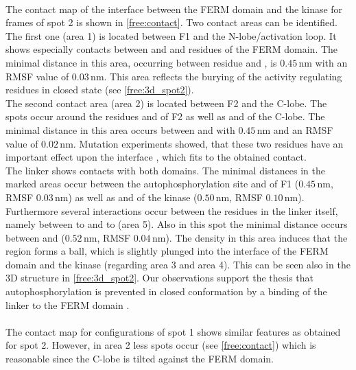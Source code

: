 %
%
%
\\
The contact map of the interface between the FERM domain and the kinase for frames of spot 2 is shown in \autoref{free:contact}. Two contact areas can be identified. The first one (area 1) is located between F1 and the N-lobe/activation loop. It shows especially contacts between  and  and residues of the FERM domain. The minimal distance in this area, occurring between residue  and , is $0.45\,\si{\nano\metre}$ with an RMSF value of $0.03\,\si{\nano\metre}$. This area reflects the burying of the activity regulating residues in closed state (see \autoref{free:3d_spot2}).\\
The second contact area (area 2) is located between F2 and the C-lobe. The spots occur around the residues  and  of F2 as well as  and  of the C-lobe. The minimal distance in this area occurs between  and  with $0.45\,\si{\nano\metre}$ and an RMSF value of $0.02\,\si{\nano\metre}$. Mutation experiments showed, that these two residues have an important effect upon the interface \autocite{structFAK}, which fits to the obtained contact.\\
The linker shows contacts with both domains. The minimal distances in the marked areas occur between the autophosphorylation site  and  of F1 ($0.45\,\si{\nano\metre}$, RMSF $0.03\,\si{\nano\metre}$) as well as  and  of the kinase ($0.50\,\si{\nano\metre}$, RMSF $0.10\,\si{\nano\metre}$). Furthermore several interactions occur between the residues in the linker itself, namely between  to  and  to  (area 5). Also in this spot the minimal distance occurs between  and  ($0.52\,\si{\nano\metre}$, RMSF $0.04\,\si{\nano\metre}$). The density in this area induces that the region forms a ball, which is slightly plunged into the interface of the FERM domain and the kinase (regarding area 3 and area 4). This can be seen also in the 3D structure in \autoref{free:3d_spot2}. Our observations support the thesis that autophosphorylation is prevented in closed conformation by a binding of the linker to the FERM domain \autocite{pap003}.\\
\\
The contact map for configurations of spot 1 shows similar features as obtained for spot 2. However, in area 2 less spots occur (see \autoref{free:contact}) which is reasonable since the C-lobe is tilted against the FERM domain. %
